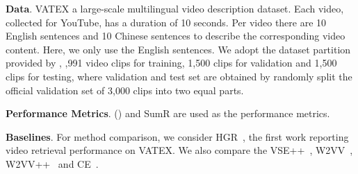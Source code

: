 \begin{table} [tb!]
\renewcommand{\arraystretch}{1.2}
\caption{\textbf{State-of-the-art on VATEX}. Our proposed model performs the best.}
\label{tab:vatex_perf}
\centering 
{}\end{table}


\textbf{Data}. 
VATEX \cite{wang2019vatex} a large-scale multilingual video description dataset. Each video, collected for YouTube, has a duration of 10 seconds. Per video there are 10 English sentences and 10 Chinese sentences to describe the corresponding video content. Here, we only use the English sentences. 
We adopt the dataset partition provided by \cite{chen2020fine}, ,991 video clips for training, 1,500 clips for validation and 1,500 clips for testing, where validation and test set are obtained by randomly split the official validation set of 3,000 clips into two equal parts.


\textbf{Performance Metrics}. 
 () and SumR are used as the performance metrics.

\textbf{Baselines}. For method comparison, we consider HGR~\cite{chen2020fine}, the first work reporting video retrieval performance on VATEX. We also compare the VSE++~\cite{faghri2017vse}, W2VV~\cite{dong2018predicting}, W2VV++~\cite{li2019w2vv++} and CE~\cite{liu2019use}.

